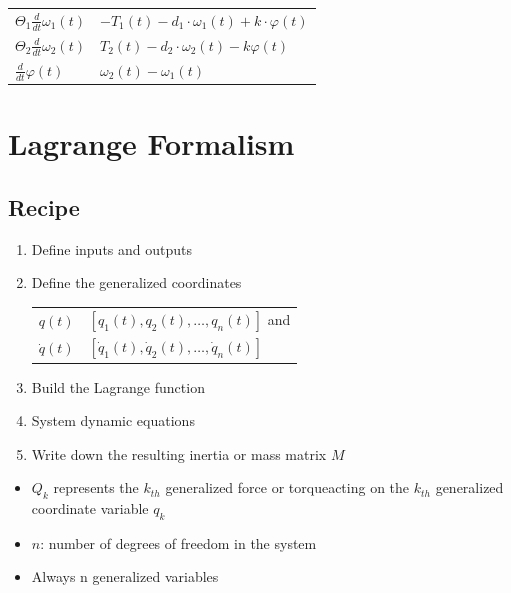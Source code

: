 \documentclass[10pt,a4paper]{scrartcl}
\begin{document}
\begin{multicols*}{3}
\begin{enumerate}
\begin{tabular}{l@{ = }l}
$\Theta_1\frac{d}{dt} \omega_1(t)$&$-T_1(t)-d_1\cdot\omega_1(t)+k\cdot\varphi(t)$\\
$\Theta_2\frac{d}{dt}\omega_2(t)$&$T_2(t)-d_2\cdot\omega_2(t)-k\varphi(t)$\\
$\frac{d}{dt}\varphi(t)$&$\omega_2(t)-\omega_1(t)$
\end{tabular}
\end{enumerate}


\vfill
\null
\columnbreak

\section{Lagrange Formalism}

\subsection{Recipe}

\begin{enumerate}
\item Define inputs and outputs
\item Define the generalized coordinates

\begin{tabular}{l@{ = }l}
$q(t)$&$[q_1(t),q_2(t),\ldots,q_n(t)]$ and\\
$\dot{q}(t)$&$[\dot{q}_1(t),\dot{q}_2(t),\ldots,\dot{q}_n(t)]$
\end{tabular}
\item Build the Lagrange function
\item System dynamic equations
\item Write down the resulting inertia or mass matrix $M$
\end{enumerate}

\begin{itemize}
\item $Q_k$ represents the $k_{th}$ \glqq generalized force or torque\grqq acting on the $k_{th}$ generalized coordinate variable $q_k$
\item $n$: number of degrees of freedom in the system
\item Always n generalized variables
\end{itemize}


\end{multicols*}
\end{document}
